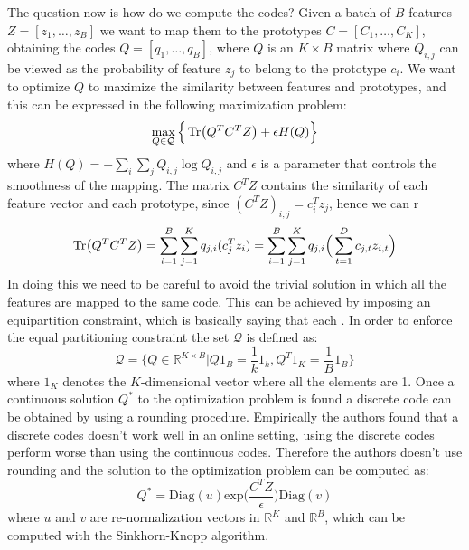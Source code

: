 The question now is how do we compute the codes? Given a batch of $B$ features $Z = [z_1, \dots, z_B]$ we want to map them to the prototypes $C= [C_1, \dots, C_K]$, obtaining the codes $Q = [q_1, \dots, q_B]$, where $Q$ is an $K\times B$ matrix where $Q_{i,j}$ can be viewed as the probability of feature $z_j$ to belong to the prototype $c_i$. We want to optimize $Q$ to maximize the similarity between features and prototypes, and this can be expressed in the following maximization problem:
\[ \max_{Q \in \mathcal{Q}} \Big\{ \Tr(Q^TC^TZ) + \epsilon H (Q) \Big\}\]
where $H(Q) = -\sum_i \sum_j Q_{i,j}\log Q_{i,j}$ and $\epsilon$ is a parameter that controls the smoothness of the mapping. The matrix $C^TZ$ contains the similarity of each feature vector and each prototype, since $(C^TZ)_{i,j} = c_i^Tz_j$, hence we can r
\[ \Tr(Q^TC^TZ) =  \sum_{i=1}^B\sum_{j=1}^K q_{j,i}(c^T_jz_i) = \sum_{i=1}^B\sum_{j=1}^K q_{j,i}\Big(\sum_{t=1}^Dc_{j,t}z_{i,t}\Big) \]
In doing this we need to be careful to avoid the trivial solution in which all the features are mapped to the same code. This can be achieved by imposing an equipartition constraint, which is basically saying that each . In order to enforce the equal partitioning constraint the set $\mathcal{Q}$ is defined as:
\[ \mathcal{Q} = \{Q \in \mathbb{R}^{K \times B} | Q1_B = \frac{1}{k}1_k, Q^T1_K = \frac{1}{B}1_B \} \]
where $1_K$ denotes the $K$-dimensional vector where all the elements are 1. Once a continuous solution $Q^*$ to the optimization problem is found a discrete code can be obtained by using a rounding procedure. Empirically the authors found that a discrete codes doesn't work well in an online setting, using the discrete codes perform worse than using the continuous codes. Therefore the authors doesn't use rounding and the solution to the optimization problem can be computed as:
\[ Q^* = \text{Diag}(u)\text{exp}\Big(\frac{C^TZ}{\epsilon}\Big)\text{Diag}(v) \]
where $u$ and $v$ are re-normalization vectors in $\mathbb{R}^K$ and $\mathbb{R}^B$, which can be computed with the Sinkhorn-Knopp
algorithm.
